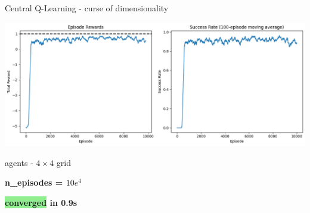 \documentclass[aspectratio=169,xcolor=dvipsnames]{beamer}
\begin{document}
\begin{frame}{Central Q-Learning - curse of dimensionality}

\center
\includegraphics[scale=0.4]{images/2-agents-4x4-10000ep.png}

\begin{minipage}{0.4\textwidth}
    \begin{block}{ agents - $4 \times 4$ grid} 
            \center
            \vspace{-10pt}
            \begin{inparaitem}
                \item \textbf{n\_episodes = $10e^4$}
                \item \textbf{\colorbox{lightgreen}{converged} in \textbf{0.9s}}
            \end{inparaitem}  
    \end{block}
\end{minipage}

\end{frame}

\end{document}
